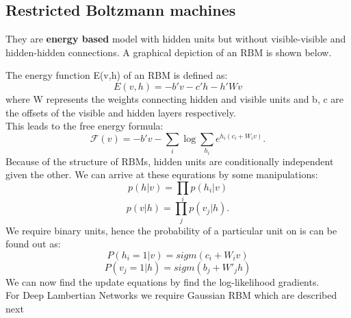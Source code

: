 \documentclass{article}
\begin{document}
\subsection{Restricted Boltzmann machines}
They are \textbf{energy based} model with hidden units but without visible-visible and hidden-hidden connections. A graphical depiction of an RBM is shown below.
\begin{center}
\end{center}
The energy function E(v,h) of an RBM is defined as:
\begin{equation}
E(v,h) = - b'v - c'h - h'Wv
\end{equation}
where W represents the weights connecting hidden and visible units and b, c are the offsets of the visible and hidden layers respectively.
\\This leads to the free energy formula:
\begin{equation}
\mathcal{F}(v)= - b'v - \sum_i \log \sum_{h_i} e^{h_i (c_i + W_i v)}.
\end{equation}
Because of the structure of RBMs, hidden units are conditionally independent given the other. We can arrive at these equrations by some manipulations:
\begin{equation}
 p(h|v) = \prod_i p(h_i|v)
\end{equation}
\begin{equation}
p(v|h) = \prod_j p(v_j|h).
\end{equation}
We require binary units, hence the probability of a particular unit on is can be found out as:
\begin{equation}
P(h_i=1|v) = sigm(c_i + W_i v)
\end{equation} 
\begin{equation}
P(v_j=1|h) = sigm(b_j + W'_j h)
\end{equation}
We can now find the update equations by find the log-likelihood gradients. \\For Deep Lambertian Networks we require Gaussian RBM which are described next 
\end{document}
